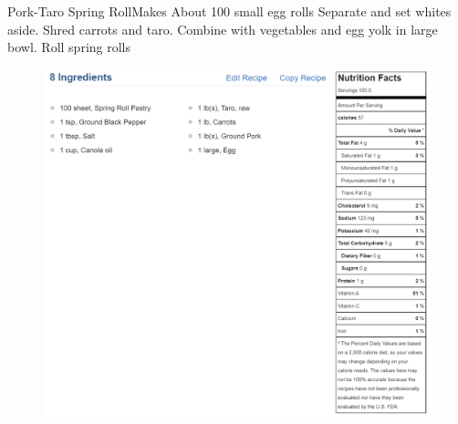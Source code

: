 \documentclass[]{article}
\title{}
\author{}
\begin{document}
\begin{recipe}{Pork-Taro Spring Roll}{}{Makes About 100 small egg rolls}
	Separate and set whites aside. 
	Shred carrots and taro. 
	Combine with vegetables and egg yolk in large bowl.
	Roll spring rolls
\end{recipe}

\begin{figure}[h]
	\includegraphics[width=\linewidth]{MFP.png}
\end{figure}
\end{document}
